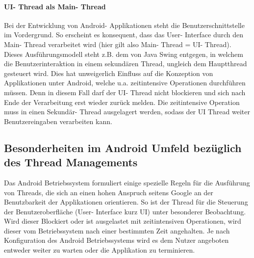 \documentclass[12pt,oneside,a4paper,bibtotoc,liststotoc]{scrreprt}
\begin{document}
\paragraph{UI- Thread als Main- Thread}
Bei der Entwicklung von Android- Applikationen steht die Benutzerschnittstelle im Vordergrund. So erscheint es konsequent, dass das User- Interface durch den Main- Thread verarbeitet wird (hier gilt also Main- Thread = UI- Thread). Dieses Ausführungsmodell steht z.B. dem von Java Swing entgegen, in welchem die Benutzerinteraktion in einem sekundären Thread, ungleich dem Hauptthread gesteuert wird. Dies hat unweigerlich Einfluss auf die Konzeption von Applikationen unter Android,
 welche u.a. zeitintensive Operationen durchführen müssen. Denn in diesem Fall darf der UI- Thread nicht blockieren und sich nach Ende der Verarbeitung erst wieder zurück melden. Die zeitintensive Operation muss in einen Sekundär- Thread ausgelagert werden, sodass der UI Thread weiter Benutzereingaben verarbeiten kann.

\subsection{Besonderheiten im Android Umfeld bezüglich des Thread Managements}
Das Android Betriebssystem formuliert einige spezielle Regeln für die Ausführung von Threads, die sich an einen hohen Anspruch seitens Google an der Benutzbarkeit der Applikationen orientieren. So ist der Thread für die Steuerung der Benutzeroberfläche (User- Interface kurz UI) unter besonderer Beobachtung. Wird dieser Blockiert oder ist ausgelastet mit zeitintensiven Operationen, wird dieser vom Betriebssystem nach einer bestimmten Zeit angehalten. Je nach Konfiguration des Android Betriebssystems wird es dem Nutzer angeboten entweder weiter zu warten oder die Applikation zu terminieren.
\end{document}

